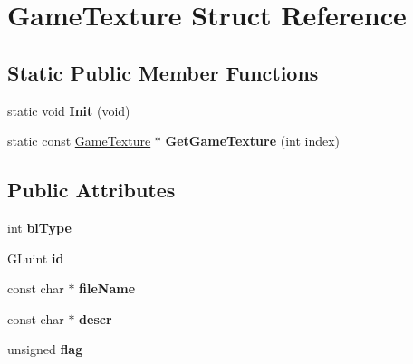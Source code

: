 \hypertarget{structGameTexture}{\section{\-Game\-Texture \-Struct \-Reference}
\label{structGameTexture}
}
\subsection*{\-Static \-Public \-Member \-Functions}
\begin{DoxyCompactItemize}
\item 
\hypertarget{structGameTexture_a0e9bf994207d7b2e4c24e742a1dda361}{static void {\bfseries \-Init} (void)}\label{structGameTexture_a0e9bf994207d7b2e4c24e742a1dda361}

\item 
\hypertarget{structGameTexture_a686f11f41c5629e865503829e925563b}{static const \hyperlink{structGameTexture}{\-Game\-Texture} $\ast$ {\bfseries \-Get\-Game\-Texture} (int index)}\label{structGameTexture_a686f11f41c5629e865503829e925563b}

\end{DoxyCompactItemize}
\subsection*{\-Public \-Attributes}
\begin{DoxyCompactItemize}
\item 
\hypertarget{structGameTexture_afbbbbb40772be9d8efd7a9745c51fc5f}{int {\bfseries bl\-Type}}\label{structGameTexture_afbbbbb40772be9d8efd7a9745c51fc5f}

\item 
\hypertarget{structGameTexture_a3982258556ec5b47c9feb7c588ccb999}{\-G\-Luint {\bfseries id}}\label{structGameTexture_a3982258556ec5b47c9feb7c588ccb999}

\item 
\hypertarget{structGameTexture_a3fe982d67133975c95dd3bf920fef66b}{const char $\ast$ {\bfseries file\-Name}}\label{structGameTexture_a3fe982d67133975c95dd3bf920fef66b}

\item 
\hypertarget{structGameTexture_ad1a245011045fd8af37be8f604b80e93}{const char $\ast$ {\bfseries descr}}\label{structGameTexture_ad1a245011045fd8af37be8f604b80e93}

\item 
\hypertarget{structGameTexture_adbb8cf75f8fd60c01ab9f9de4eca36ac}{unsigned {\bfseries flag}}\label{structGameTexture_adbb8cf75f8fd60c01ab9f9de4eca36ac}

\end{DoxyCompactItemize}
